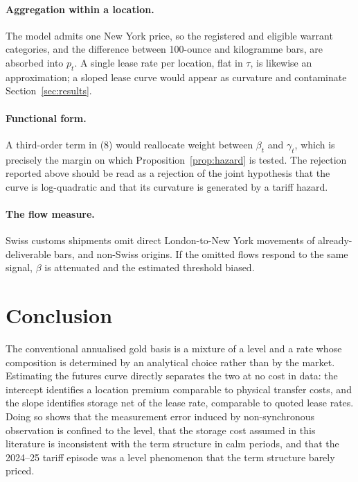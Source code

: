 \documentclass[11pt,a4paper]{article}
\begin{document}
\paragraph{Aggregation within a location.}
The model admits one New York price, so the registered and eligible warrant
categories, and the difference between 100-ounce and kilogramme bars, are
absorbed into $p_t$. A single lease rate per location, flat in $\tau$, is
likewise an approximation; a sloped lease curve would appear as curvature and
contaminate Section~\ref{sec:results}.

\paragraph{Functional form.}
A third-order term in (8) would reallocate weight between $\beta_t$ and
$\gamma_t$, which is precisely the margin on which
Proposition~\ref{prop:hazard} is tested. The rejection reported above should be
read as a rejection of the joint hypothesis that the curve is log-quadratic and
that its curvature is generated by a tariff hazard.

\paragraph{The flow measure.}
Swiss customs shipments omit direct London-to-New York movements of
already-deliverable bars, and non-Swiss origins. If the omitted flows respond
to the same signal, $\beta$ is attenuated and the estimated threshold biased.

\section{Conclusion}
\label{sec:conclusion}

The conventional annualised gold basis is a mixture of a level and a rate whose
composition is determined by an analytical choice rather than by the market.
Estimating the futures curve directly separates the two at no cost in data: the
intercept identifies a location premium comparable to physical transfer costs,
and the slope identifies storage net of the lease rate, comparable to quoted
lease rates. Doing so shows that the measurement error induced by
non-synchronous observation is confined to the level, that the storage cost
assumed in this literature is inconsistent with the term structure in calm
periods, and that the 2024--25 tariff episode was a level phenomenon that the
term structure barely priced.
\end{document}
